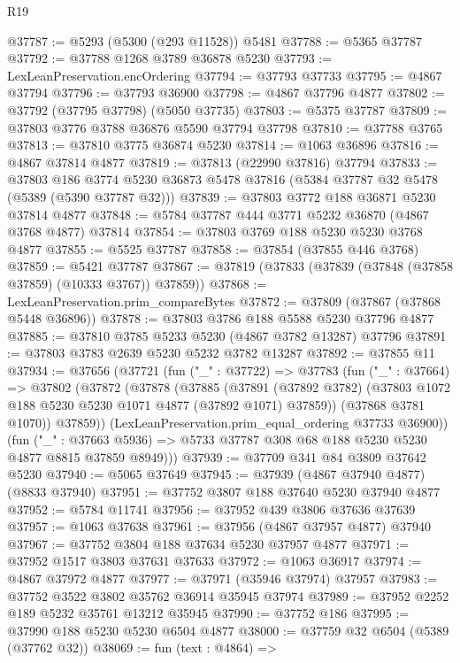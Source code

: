 \begin{lexlean}{R19}
\begin{coremodule}
@37787 := @5293 (@5300 (@293 @11528)) @5481
@37788 := @5365 @37787
@37792 := @37788 @1268 @3789 @36878 @5230
@37793 := LexLeanPreservation.encOrdering
@37794 := @37793 @37733
@37795 := @4867 @37794
@37796 := @37793 @36900
@37798 := @4867 @37796 @4877
@37802 := @37792 (@37795 @37798) (@5050 @37735)
@37803 := @5375 @37787
@37809 := @37803 @3776 @3788 @36876 @5590 @37794 @37798
@37810 := @37788 @3765
@37813 := @37810 @3775 @36874 @5230
@37814 := @1063 @36896
@37816 := @4867 @37814 @4877
@37819 := @37813 (@22990 @37816) @37794
@37833 := @37803
    @186
    @3774
    @5230
    @36873
    @5478
    @37816
    (@5384 @37787 @32 @5478 (@5389 (@5390 @37787 @32)))
@37839 := @37803 @3772 @188 @36871 @5230 @37814 @4877
@37848 := @5784 @37787 @444 @3771 @5232 @36870 (@4867 @3768 @4877) @37814
@37854 := @37803 @3769 @188 @5230 @5230 @3768 @4877
@37855 := @5525 @37787
@37858 := @37854 (@37855 @446 @3768)
@37859 := @5421 @37787
@37867 := @37819 (@37833 (@37839 (@37848 (@37858 @37859) (@10333 @3767)) @37859))
@37868 := LexLeanPreservation.prim_compareBytes
@37872 := @37809 (@37867 (@37868 @5448 @36896))
@37878 := @37803 @3786 @188 @5588 @5230 @37796 @4877
@37885 := @37810 @3785 @5233 @5230 (@4867 @3782 @13287) @37796
@37891 := @37803 @3783 @2639 @5230 @5232 @3782 @13287
@37892 := @37855 @11
@37934 := @37656
    (@37721
      (fun ("_" : @37722) =>
      @37783
        (fun ("_" : @37664) =>
        @37802
          (@37872
            (@37878
              (@37885
                (@37891
                  (@37892 @3782)
                  (@37803 @1072 @188 @5230 @5230 @1071 @4877 (@37892 @1071) @37859))
                (@37868 @3781 @1070))
              @37859))
          (LexLeanPreservation.prim_equal_ordering @37733 @36900))
        (fun ("_" : @37663 @5936) =>
        @5733 @37787 @308 @68 @188 @5230 @5230 @4877 @8815 @37859 @8949)))
@37939 := @37709 @341 @84 @3809 @37642 @5230
@37940 := @5065 @37649
@37945 := @37939 (@4867 @37940 @4877) (@8833 @37940)
@37951 := @37752 @3807 @188 @37640 @5230 @37940 @4877
@37952 := @5784 @11741
@37956 := @37952 @439 @3806 @37636 @37639
@37957 := @1063 @37638
@37961 := @37956 (@4867 @37957 @4877) @37940
@37967 := @37752 @3804 @188 @37634 @5230 @37957 @4877
@37971 := @37952 @1517 @3803 @37631 @37633
@37972 := @1063 @36917
@37974 := @4867 @37972 @4877
@37977 := @37971 (@35946 @37974) @37957
@37983 := @37752 @3522 @3802 @35762 @36914 @35945 @37974
@37989 := @37952 @2252 @189 @5232 @35761 @13212 @35945
@37990 := @37752 @186
@37995 := @37990 @188 @5230 @5230 @6504 @4877
@38000 := @37759 @32 @6504 (@5389 (@37762 @32))
@38069 := fun (text : @4864) =>

\end{coremodule}
\end{lexlean}
